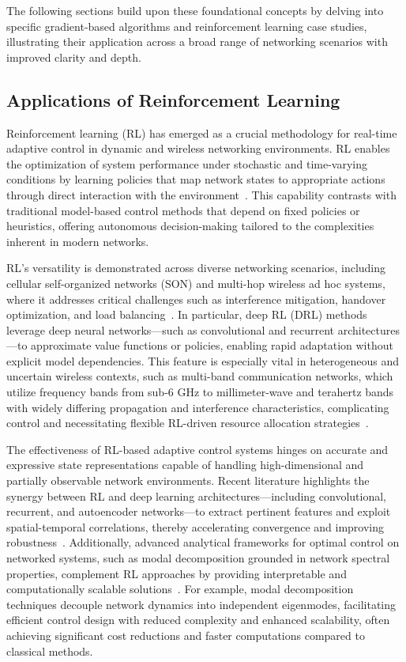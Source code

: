 \documentclass[sigconf]{acmart}
\begin{document}
The following sections build upon these foundational concepts by delving into specific gradient-based algorithms and reinforcement learning case studies, illustrating their application across a broad range of networking scenarios with improved clarity and depth.

\subsection{Applications of Reinforcement Learning}

Reinforcement learning (RL) has emerged as a crucial methodology for real-time adaptive control in dynamic and wireless networking environments. RL enables the optimization of system performance under stochastic and time-varying conditions by learning policies that map network states to appropriate actions through direct interaction with the environment~\cite{ref2,ref5,ref7,ref12,ref31,ref32,ref33,ref34,ref35,ref50}. This capability contrasts with traditional model-based control methods that depend on fixed policies or heuristics, offering autonomous decision-making tailored to the complexities inherent in modern networks.

RL's versatility is demonstrated across diverse networking scenarios, including cellular self-organized networks (SON) and multi-hop wireless ad hoc systems, where it addresses critical challenges such as interference mitigation, handover optimization, and load balancing~\cite{ref31,ref32,ref33,ref34,ref35}. In particular, deep RL (DRL) methods leverage deep neural networks—such as convolutional and recurrent architectures—to approximate value functions or policies, enabling rapid adaptation without explicit model dependencies. This feature is especially vital in heterogeneous and uncertain wireless contexts, such as multi-band communication networks, which utilize frequency bands from sub-6 GHz to millimeter-wave and terahertz bands with widely differing propagation and interference characteristics, complicating control and necessitating flexible RL-driven resource allocation strategies~\cite{ref12}.

The effectiveness of RL-based adaptive control systems hinges on accurate and expressive state representations capable of handling high-dimensional and partially observable network environments. Recent literature highlights the synergy between RL and deep learning architectures—including convolutional, recurrent, and autoencoder networks—to extract pertinent features and exploit spatial-temporal correlations, thereby accelerating convergence and improving robustness~\cite{ref31,ref2,ref50}. Additionally, advanced analytical frameworks for optimal control on networked systems, such as modal decomposition grounded in network spectral properties, complement RL approaches by providing interpretable and computationally scalable solutions~\cite{ref32,ref34}. For example, modal decomposition techniques decouple network dynamics into independent eigenmodes, facilitating efficient control design with reduced complexity and enhanced scalability, often achieving significant cost reductions and faster computations compared to classical methods.
\end{document}
